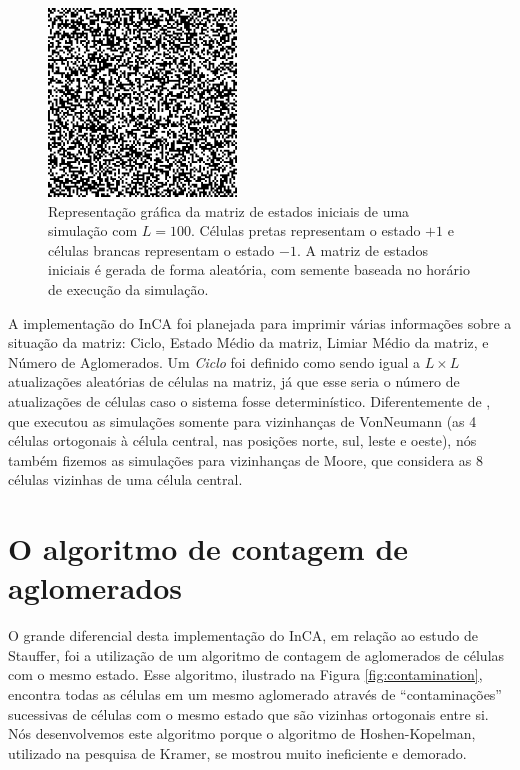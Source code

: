 \documentclass[
	12pt,				%
	openright,			%
	twoside,			%
	a4paper,			%
	english,			%
	french,				%
	spanish,			%
	brazil				%
	]{abntex2}
\begin{document}
\begin{figure}
    \centering
    \includegraphics[width=5cm]{matrizL100Ciclo0.png}
    \caption{Representação gráfica da matriz de estados iniciais de uma simulação com $L=100$. Células pretas representam o estado $+1$ e células brancas representam o estado $-1$. A matriz de estados iniciais é gerada de forma aleatória, com semente baseada no horário de execução da simulação.}
    \label{fig:matrizL100Ciclo0}
\end{figure}

A implementação do InCA foi planejada para imprimir várias informações sobre a situação da matriz: Ciclo, Estado Médio da matriz, Limiar Médio da matriz, e Número de Aglomerados. Um \textit{Ciclo} foi definido como sendo igual a $L\times L$ atualizações aleatórias de células na matriz, já que esse seria o número de atualizações de células caso o sistema fosse determinístico. Diferentemente de , que executou as simulações somente para vizinhanças de VonNeumann (as 4 células ortogonais à célula central, nas posições norte, sul, leste e oeste), nós também fizemos as simulações para vizinhanças de Moore, que considera as 8 células vizinhas de uma célula central.

\section{O algoritmo de contagem de aglomerados}

O grande diferencial desta implementação do InCA, em relação ao estudo de Stauffer, foi a utilização de um algoritmo de contagem de aglomerados de células com o mesmo estado. Esse algoritmo, ilustrado na Figura \ref{fig:contamination}, encontra todas as células em um mesmo aglomerado através de ``contaminações'' sucessivas de células com o mesmo estado que são vizinhas ortogonais entre si. Nós desenvolvemos este algoritmo porque o algoritmo de Hoshen-Kopelman, utilizado na pesquisa de Kramer, se mostrou muito ineficiente e demorado.
\end{document}
